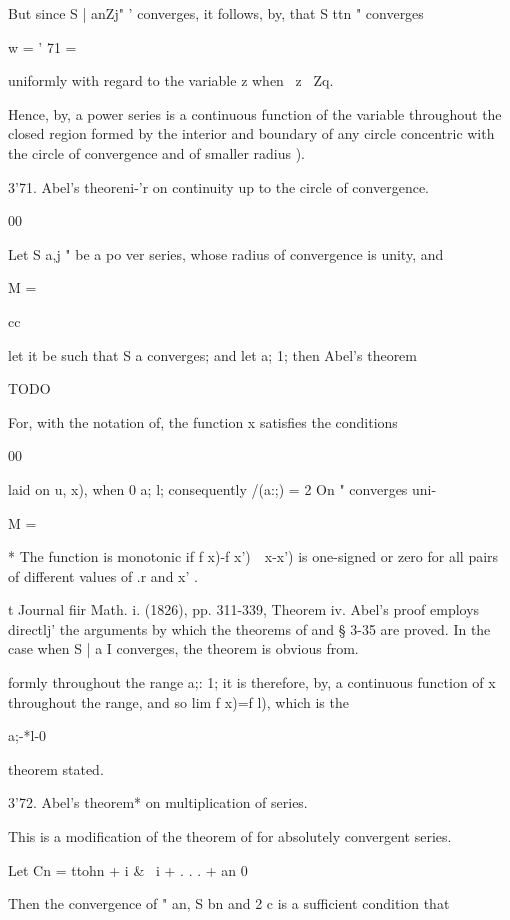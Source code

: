 But since S | anZj" ' converges, it follows, by, that S ttn "
converges

w = ' 71 =

uniformly with regard to the variable z when \ z \ Zq.

Hence, by, a power series is a continuous function of the
variable throughout the closed region formed by the interior and
boundary of any circle concentric with the circle of convergence and
of smaller radius ).

  3'71. Abel's theoreni-'r on continuity up to the circle of
convergence.

00

Let S a,j " be a po ver series, whose radius of convergence is unity,
and

M =

cc

let it be such that S a converges; and let a; 1; then Abel's theorem

TODO

For, with the notation of, the function x satisfies the
conditions

00

laid on u, x), when 0 a; l; consequently /(a:;) = 2 On " converges
uni-

M =

* The function is monotonic if f x)-f x')\ \ x-x') is one-signed or
zero for all pairs of different values of .r and x' .

t Journal fiir Math. i. (1826), pp. 311-339, Theorem iv. Abel's proof
employs directlj' the arguments by which the theorems of and §
3-35 are proved. In the case when S | a I converges, the theorem is
obvious from.

%
%

formly throughout the range a;: 1; it is therefore, by, a
continuous function of x throughout the range, and so lim f x)=f l),
which is the

a;-*l-0

theorem stated.

3'72. Abel's theorem* on multiplication of series.

This is a modification of the theorem of for absolutely
convergent series.

Let Cn = ttohn + i \& \ i + . . . + an 0 

Then the convergence of " an, S bn and 2 c is a sufficient condition
that


